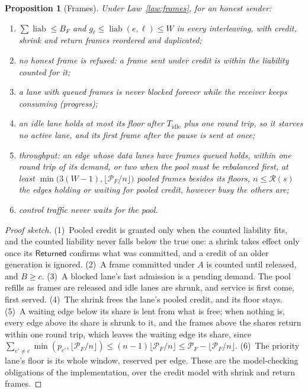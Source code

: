 \documentclass[journal]{IEEEtran}
\newtheorem{proposition}{Proposition}
\newcommand{\Rg}{\mathcal{R}}
\newcommand{\Pool}{\mathcal{P}}
\newcommand{\liab}{\operatorname{liab}}
\begin{document}
\begin{proposition}[Frames]\label{prop:frames}
Under Law~\ref{law:frames}, for an honest sender:
\begin{enumerate}[leftmargin=1.5em]
\item $\sum\liab\le B_F$ and $g_\ell\le\liab(e,\ell)\le W$ in every interleaving, with credit,
shrink and return frames reordered and duplicated;
\item no honest frame is refused: a frame sent under credit is within the liability counted for
it;
\item a lane with queued frames is never blocked forever while the receiver keeps consuming
(progress);
\item an idle lane holds at most its floor after $T_{\mathrm{idle}}$ plus one round trip, so it
starves no active lane, and its first frame after the pause is sent at once;
\item \emph{throughput}: an edge whose data lanes have frames queued holds, within one round
trip of its demand, or two when the pool must be rebalanced first, at least
$\min\bigl(3(W-1),\lfloor\Pool_F/n\rfloor\bigr)$ pooled frames besides its floors, $n\le\Rg(s)$ the
edges holding or waiting for pooled credit, however busy the others are;
\item control traffic never waits for the pool.
\end{enumerate}
\end{proposition}
\begin{proof}[Proof sketch]
(1)~Pooled credit is granted only when the counted liability fits, and the counted liability
never falls below the true one: a shrink takes effect only once its $\mathsf{Returned}$ confirms
what was committed, and a credit of an older generation is ignored.
(2)~A frame committed under $A$ is counted until released, and $B\ge c$.
(3)~A blocked lane's last admission is a pending demand.  The pool refills as frames are
released and idle lanes are shrunk, and service is first come, first served.
(4)~The shrink frees the lane's pooled credit, and its floor stays.
(5)~A waiting edge below its share is lent from what is free; when nothing is, every edge above
its share is shrunk to it, and the frames above the shares return within one round trip, which
leaves the waiting edge its share, since $\sum_{e'\ne e}\min(p_{e'},\lfloor\Pool_F/n\rfloor)\le
(n-1)\lfloor\Pool_F/n\rfloor\le\Pool_F-\lfloor\Pool_F/n\rfloor$.
(6)~The priority lane's floor is its whole window, reserved per edge.
These are the model-checking obligations of the implementation, over the credit model with
shrink and return frames.
\end{proof}
\end{document}
